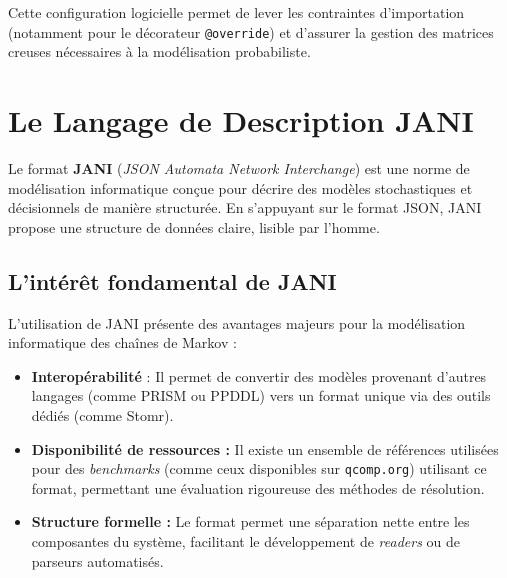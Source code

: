 \documentclass[14pt, a4paper]{extarticle}
\begin{document}
\noindent Cette configuration logicielle permet de lever les contraintes d'importation (notamment pour le décorateur \texttt{@override}) et d'assurer la gestion des matrices creuses nécessaires à la modélisation probabiliste.

\section{Le Langage de Description JANI}

Le format \textbf{JANI} (\textit{JSON Automata Network Interchange}) est une norme de modélisation informatique conçue pour décrire des modèles stochastiques et décisionnels de manière structurée. En s'appuyant sur le format JSON, JANI propose une structure de données claire, lisible par l'homme.
\subsection{L'intérêt fondamental de JANI}

L'utilisation de JANI présente des avantages majeurs pour la modélisation informatique des chaînes de Markov :
\begin{itemize}
    \item \textbf{Interopérabilité} : Il permet de convertir des modèles provenant d'autres langages (comme PRISM ou PPDDL) vers un format unique via des outils dédiés (comme Stomr).
    \item \textbf{Disponibilité de ressources :} Il existe un ensemble de références utilisées pour des \textit{benchmarks} (comme ceux disponibles sur \texttt{qcomp.org}) utilisant ce format, permettant une évaluation rigoureuse des méthodes de résolution.
    \item \textbf{Structure formelle :} Le format permet une séparation nette entre les composantes du système, facilitant le développement de \textit{readers} ou de parseurs automatisés.
\end{itemize}
\end{document}
